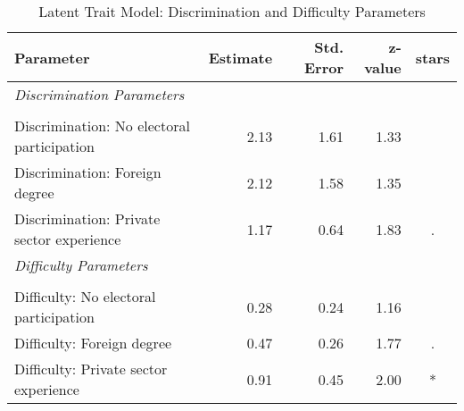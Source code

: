 \begin{table}[ht]
\centering
\caption{Latent Trait Model: Discrimination and Difficulty Parameters} 
\label{tab:ltm_parameters}
\begin{tabular}{lrrrc}
  \hline
Parameter & Estimate & Std. Error & z-value & stars \\ 
  \hline
\multicolumn{4}{l}{\textit{Discrimination Parameters}} \\ &  &  &  &  \\ 
  Discrimination: No electoral participation & 2.13 & 1.61 & 1.33 &  \\ 
  Discrimination: Foreign degree & 2.12 & 1.58 & 1.35 &  \\ 
  Discrimination: Private sector experience & 1.17 & 0.64 & 1.83 & . \\ 
  \multicolumn{4}{l}{\textit{Difficulty Parameters}} \\ &  &  &  &  \\ 
  Difficulty: No electoral participation & 0.28 & 0.24 & 1.16 &  \\ 
  Difficulty: Foreign degree & 0.47 & 0.26 & 1.77 & . \\ 
  Difficulty: Private sector experience & 0.91 & 0.45 & 2.00 & * \\ 
   \hline
\end{tabular}
\end{table}
